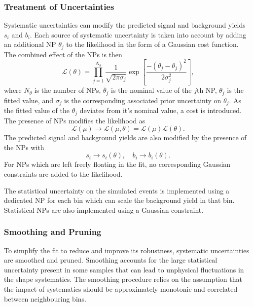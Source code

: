 \subsubsection{Treatment of Uncertainties}

Systematic uncertainties can modify the predicted signal and background yields $s_i$ and $b_i$. 
Each source of systematic uncertainty is taken into account by adding an additional NP $\theta_j$ to the likelihood in the form of a Gaussian cost function.
The combined effect of the NPs is then
%
\begin{equation}
  \mathcal{L}(\theta) = 
  \prod_{j = 1}^{N_\theta}
  \frac{1}{\sqrt{2 \pi \sigma_j}}
  \exp\left[ \frac{- (\overline{\theta}_j - \theta_j)^2}{2 \sigma_j^2} \right] ,
\end{equation}
%
where $N_\theta$ is the number of NPs, $\overline{\theta}_j$ is the nominal value of the $j$th NP, $\theta_j$ is the fitted value, and $\sigma_j$ is the corresponding associated prior uncertainty on $\theta_j$.
As the fitted value of the $\theta_j$ deviates from it's nominal value, a cost is introduced.
The presence of NPs modifies the likelihood as 
%
\begin{equation}
    \mathcal{L}(\mu) \rightarrow \mathcal{L}(\mu, \theta) = \mathcal{L}(\mu) \mathcal{L}(\theta) .
\end{equation}
%
The predicted signal and background yields are also modified by the presence of the NPs with
%
\begin{equation}
  s_i \rightarrow s_i(\theta) , \quad b_i \rightarrow b_i(\theta) .
\end{equation}
%
For NPs which are left freely floating in the fit, no corresponding Gaussian constraints are added to the likelihood.

The statistical uncertainty on the simulated events is implemented using a dedicated NP for each bin which can scale the background yield in that bin.
Statistical NPs are also implemented using a Gaussian constraint.

\subsubsection{Smoothing and Pruning}

To simplify the fit to reduce and improve its robustness, systematic uncertainties are smoothed and pruned.
Smoothing accounts for the large statistical uncertainty present in some samples that can lead to unphysical fluctuations in the shape systematics.
The smoothing procedure relies on the assumption that the impact of systematics should be approximately monotonic and correlated between neighbouring bins.

